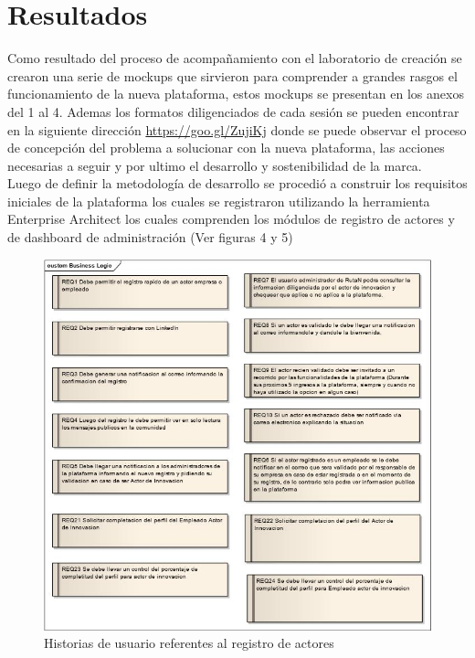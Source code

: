 \chapter*{Resultados}
Como resultado del proceso de acompañamiento con el laboratorio de creación se crearon una serie de mockups que sirvieron para comprender a grandes rasgos el funcionamiento de la nueva plataforma, estos mockups se presentan en los anexos del 1 al 4. Ademas los formatos diligenciados de cada sesión se pueden encontrar en la siguiente dirección \url{https://goo.gl/ZujiKj} donde se puede observar el proceso de concepción del problema a solucionar con la nueva plataforma, las acciones necesarias a seguir y por ultimo el desarrollo y sostenibilidad de la marca.\\

Luego de definir la metodología de desarrollo se procedió a construir los requisitos iniciales de la plataforma los cuales se registraron utilizando la herramienta Enterprise Architect los cuales comprenden los módulos de registro de actores y de dashboard de administración (Ver figuras 4 y 5)\\ 

\begin{figure}[ht]
	\includegraphics[scale=0.6, center]{images/registro.jpg}
	\caption{Historias de usuario referentes al registro de actores}
	\label{fig:img4}
\end{figure}

